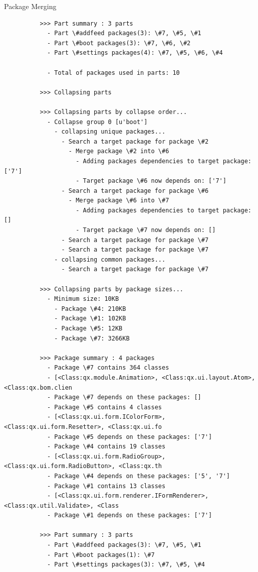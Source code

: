 \documentclass[final]{beamer}
\newlength{\onecolwid}
\begin{document}
\begin{frame}[t]
\begin{columns}[t]
\begin{column}{\onecolwid}
\begin{block}{Package Merging}
\begin{verbatim}
          >>> Part summary : 3 parts
            - Part \#addfeed packages(3): \#7, \#5, \#1
            - Part \#boot packages(3): \#7, \#6, \#2
            - Part \#settings packages(4): \#7, \#5, \#6, \#4

            - Total of packages used in parts: 10

          >>> Collapsing parts  

          >>> Collapsing parts by collapse order...
            - Collapse group 0 [u'boot']
              - collapsing unique packages...
                - Search a target package for package \#2
                  - Merge package \#2 into \#6
                    - Adding packages dependencies to target package: ['7']
                    - Target package \#6 now depends on: ['7']
                - Search a target package for package \#6
                  - Merge package \#6 into \#7
                    - Adding packages dependencies to target package: []
                    - Target package \#7 now depends on: []
                - Search a target package for package \#7
                - Search a target package for package \#7
              - collapsing common packages...
                - Search a target package for package \#7

          >>> Collapsing parts by package sizes...
            - Minimum size: 10KB
              - Package \#4: 210KB
              - Package \#1: 102KB
              - Package \#5: 12KB
              - Package \#7: 3266KB

          >>> Package summary : 4 packages
            - Package \#7 contains 364 classes
            - [<Class:qx.module.Animation>, <Class:qx.ui.layout.Atom>, <Class:qx.bom.clien
            - Package \#7 depends on these packages: []
            - Package \#5 contains 4 classes
            - [<Class:qx.ui.form.IColorForm>, <Class:qx.ui.form.Resetter>, <Class:qx.ui.fo
            - Package \#5 depends on these packages: ['7']
            - Package \#4 contains 19 classes
            - [<Class:qx.ui.form.RadioGroup>, <Class:qx.ui.form.RadioButton>, <Class:qx.th
            - Package \#4 depends on these packages: ['5', '7']
            - Package \#1 contains 13 classes
            - [<Class:qx.ui.form.renderer.IFormRenderer>, <Class:qx.util.Validate>, <Class
            - Package \#1 depends on these packages: ['7']

          >>> Part summary : 3 parts
            - Part \#addfeed packages(3): \#7, \#5, \#1
            - Part \#boot packages(1): \#7
            - Part \#settings packages(3): \#7, \#5, \#4


\end{verbatim}
\end{block}
\end{column}
\end{columns}
\end{frame}
\end{document}
